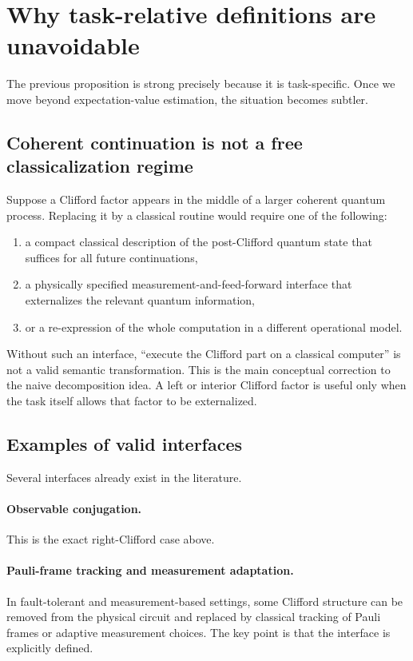 \documentclass[11pt]{article}
\theoremstyle{remark}
\begin{document}
\section{Why task-relative definitions are unavoidable}

The previous proposition is strong precisely because it is task-specific. Once we move beyond expectation-value estimation, the situation becomes subtler.

\subsection{Coherent continuation is not a free classicalization regime}

Suppose a Clifford factor appears in the middle of a larger coherent quantum process. Replacing it by a classical routine would require one of the following:
\begin{enumerate}[label=(\alph*), leftmargin=1.5em]
    \item a compact classical description of the post-Clifford quantum state that suffices for all future continuations,
    \item a physically specified measurement-and-feed-forward interface that externalizes the relevant quantum information,
    \item or a re-expression of the whole computation in a different operational model.
\end{enumerate}

Without such an interface, ``execute the Clifford part on a classical computer'' is not a valid semantic transformation. This is the main conceptual correction to the naive decomposition idea. A left or interior Clifford factor is useful only when the task itself allows that factor to be externalized.

\subsection{Examples of valid interfaces}

Several interfaces already exist in the literature.

\paragraph{Observable conjugation.}
This is the exact right-Clifford case above.

\paragraph{Pauli-frame tracking and measurement adaptation.}
In fault-tolerant and measurement-based settings, some Clifford structure can be removed from the physical circuit and replaced by classical tracking of Pauli frames or adaptive measurement choices. The key point is that the interface is explicitly defined.
\end{document}
